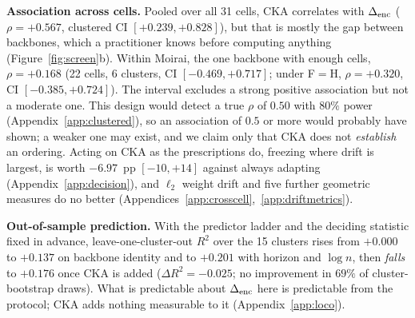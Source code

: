 \textbf{Association across cells.}  Pooled over all 31 cells, CKA correlates with
$\Delta_\text{enc}$ ($\rho{=}{+}0.567$, clustered CI $[{+}0.239,{+}0.828]$), but that is mostly
the gap between backbones, which a practitioner knows before computing anything
(Figure~\ref{fig:screen}b).  Within Moirai, the one backbone with enough cells,
$\rho{=}{+}0.168$ (22 cells, 6 clusters, CI $[-0.469,{+}0.717]$; under F${=}$H,
$\rho{=}{+}0.320$, CI $[-0.385,{+}0.724]$).  The interval excludes a strong positive association but
not a moderate one.  This design would detect a true $\rho$ of $0.50$ with
$80\%$ power (Appendix~\ref{app:clustered}), so an association of $0.5$ or more
would probably have shown; a weaker one may exist, and we
claim only that CKA does not \emph{establish} an ordering.  Acting on CKA as the prescriptions do,
freezing where drift is largest, is worth $-6.97$~pp $[-10, +14]$ against always
adapting (Appendix~\ref{app:decision}), and $\ell_2$ weight drift and five further
geometric measures do no better (Appendices~\ref{app:crosscell},~\ref{app:driftmetrics}).

\textbf{Out-of-sample prediction.}  With the predictor ladder and the deciding
statistic fixed in advance, leave-one-cluster-out $R^2$ over the 15 clusters rises
from $+0.000$ to $+0.137$ on backbone identity and to $+0.201$ with horizon and
$\log n$, then \emph{falls} to $+0.176$ once CKA is added ($\Delta R^2{=}{-}0.025$;
no improvement in $69\%$ of cluster-bootstrap draws).  What is predictable about
$\Delta_\text{enc}$ here is predictable from the protocol; CKA adds nothing measurable to it
(Appendix~\ref{app:loco}).
